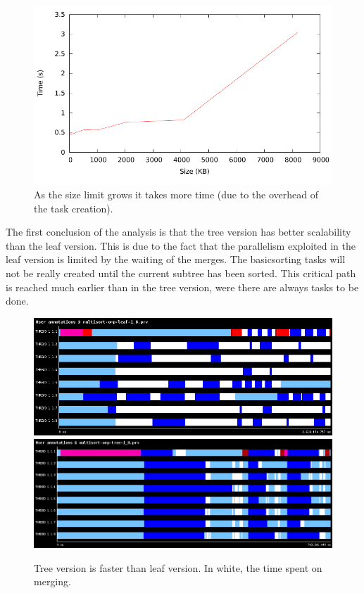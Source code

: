 \documentclass[a4paper,11pt]{article}
\begin{document}
\vspace{0.5cm}
\begin{figure}[h!]
  \center
  \includegraphics[width=1.0\textwidth]{figs/min_sort_size.pdf}
  \caption{As the size limit grows it takes more time (due to the
    overhead of the task creation).}
  \label{fig:min-sort}
\end{figure}
\vspace{0.5cm}

 The first conclusion of the analysis is that the tree version has
 better scalability than the leaf version. This is due to the fact
 that the parallelism exploited in the leaf version is limited by the
 waiting of the merges. The basicsorting tasks will not be really
 created until the current subtree has been sorted. This critical path
 is reached much earlier than in the tree version, were there are
 always tasks to be done.

\vspace{0.5cm}
\begin{figure}[h!]
  \center
  \includegraphics[width=1.0\textwidth]{figs/paraver-leaf.png}
  \includegraphics[width=1.0\textwidth]{figs/paraver-tree.png}
  \caption{Tree version is faster than leaf version. In white, the
    time spent on merging.}
  \label{fig:paraver-double}
\end{figure}
\vspace{0.5cm}
\end{document}
